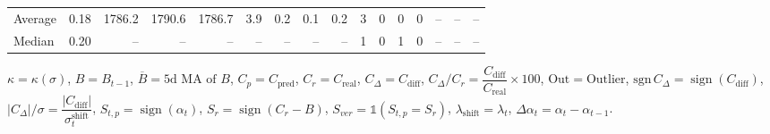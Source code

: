 \begin{threeparttable}
{\begin{tabular}{lrrrrrrrrrrrrrrr}
Average &     0.18 & 1786.2 & 1790.6 & 1786.7 &        3.9 &            0.2 &                      0.1 &                 0.2 &              3 &         0 &     0 &         0 &         -- &        -- &             -- \\
 Median &     0.20 &     -- &     -- &     -- &         -- &             -- &                       -- &                  -- &              1 &         0 &     1 &         0 &         -- &        -- &             -- \\
\bottomrule
\end{tabular}
}
\begin{tablenotes}\footnotesize
\item $\kappa=\kappa(\sigma)$, $B=B_{t-1}$, $\overline{B}=\text{5d MA of }B$, $C_p=C_{\text{pred}}$, $C_r=C_{\text{real}}$, $C_\Delta=C_{\text{diff}}$, $C_\Delta/C_r=\dfrac{C_{\text{diff}}}{C_{\text{real}}}\times100$, $\mathrm{Out}=\text{Outlier}$, $\mathrm{sgn}\,C_\Delta=\operatorname{sign}(C_{\text{diff}})$, $|C_\Delta|/\sigma=\dfrac{|C_{\text{diff}}|}{\sigma_t^{\text{shift}}}$, $S_{t,p}=\operatorname{sign}(\alpha_t)$, $S_r=\operatorname{sign}(C_r - B)$, $S_{ver}=\mathbb{1}(S_{t,p}=S_r)$, $\lambda_{\text{shift}}=\lambda_t$, $\Delta\alpha_t=\alpha_t-\alpha_{t-1}$.\end{tablenotes}
\end{threeparttable}
\endgroup

